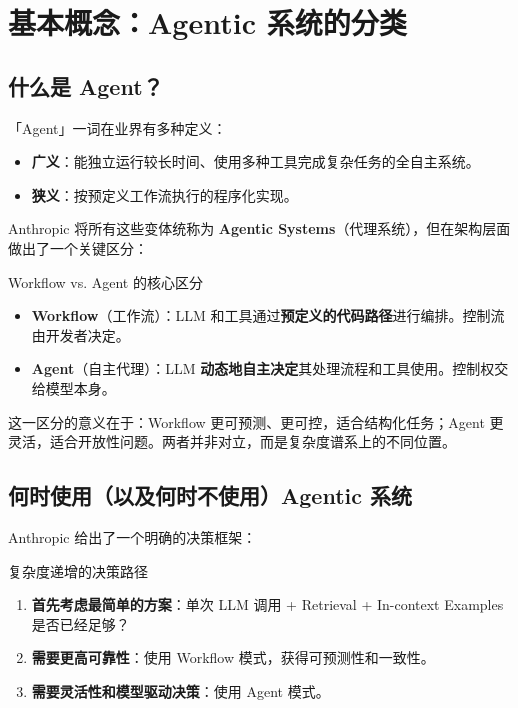 \section{基本概念：Agentic 系统的分类}

\subsection{什么是 Agent？}

「Agent」一词在业界有多种定义：
\begin{itemize}
    \item \textbf{广义}：能独立运行较长时间、使用多种工具完成复杂任务的全自主系统。
    \item \textbf{狭义}：按预定义工作流执行的程序化实现。
\end{itemize}

Anthropic 将所有这些变体统称为 \textbf{Agentic Systems}（代理系统），但在架构层面做出了一个关键区分：

\begin{importantbox}{Workflow vs. Agent 的核心区分}
\begin{itemize}
    \item \textbf{Workflow}（工作流）：LLM 和工具通过\textbf{预定义的代码路径}进行编排。控制流由开发者决定。
    \item \textbf{Agent}（自主代理）：LLM \textbf{动态地自主决定}其处理流程和工具使用。控制权交给模型本身。
\end{itemize}
\end{importantbox}

这一区分的意义在于：Workflow 更可预测、更可控，适合结构化任务；Agent 更灵活，适合开放性问题。两者并非对立，而是复杂度谱系上的不同位置。

\subsection{何时使用（以及何时不使用）Agentic 系统}

Anthropic 给出了一个明确的决策框架：

\begin{knowledgebox}{复杂度递增的决策路径}
\begin{enumerate}
    \item \textbf{首先考虑最简单的方案}：单次 LLM 调用 + Retrieval + In-context Examples 是否已经足够？
    \item \textbf{需要更高可靠性}：使用 Workflow 模式，获得可预测性和一致性。
    \item \textbf{需要灵活性和模型驱动决策}：使用 Agent 模式。
\end{enumerate}
\end{knowledgebox}

